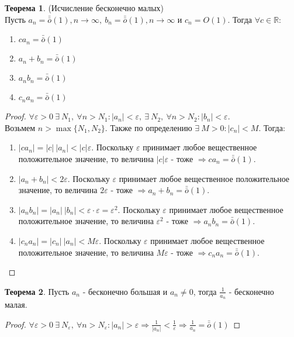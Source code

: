\documentclass[a4paper, 12pt]{article}
\newcommand{\R}{\mathbb{R}}
\renewcommand{\epsilon}{\varepsilon}
\theoremstyle{definition}
\newtheorem*{theorem}{Теорема}
\begin{document}
        \begin{theorem} (Исчисление бесконечно малых)\\
            Пусть $a_n=\bar{\bar{o}}{(1)}, n\to \infty,\ b_n=\bar{\bar{o}}{(1)}, n\to \infty$ и $c_n=O(1)$. Тогда $\forall c\in \R$:
            \begin{enumerate}
                \item $ca_n=\bar{\bar{o}}{(1)}$
                \item $a_n+b_n=\bar{\bar{o}}{(1)}$
                \item $a_n b_n=\bar{\bar{o}}{(1)}$
                \item $c_n a_n=\bar{\bar{o}}{(1)}$
            \end{enumerate}
        \end{theorem} 
        \begin{proof}
            $\forall \epsilon>0\ \exists\ N_1,\ \forall n>N_1: |a_n|<\epsilon,\ \exists\ N_2,\ \forall n>N_2: |b_n|<\epsilon$.\\Возьмем $n>\max\{N_1,N_2\}$. Также по определению $\exists\ M>0: |c_n|<M$. Тогда:
            \begin{enumerate}
                \item $|c a_n|=|c|\ |a_n|<|c|\epsilon$. Поскольку $\epsilon$ принимает любое вещественное положительное значение, то величина $|c|\epsilon$ - тоже $\Rightarrow c a_n=\bar{\bar{o}}{(1)}$.
                \item $|a_n+b_n|<2\epsilon$. Поскольку $\epsilon$ принимает любое вещественное положительное значение, то величина $2\epsilon$ - тоже $\Rightarrow a_n+b_n=\bar{\bar{o}}{(1)}$.
                \item $|a_n b_n| = |a_n|\ |b_n|<\epsilon\cdot\epsilon=\epsilon^2$. Поскольку $\epsilon$ принимает любое вещественное положительное значение, то величина $\epsilon^2$ - тоже $\Rightarrow a_n b_n=\bar{\bar{o}}{(1)}$.
                \item $|c_n a_n|=|c_n|\ |a_n|<M\epsilon$. Поскольку $\epsilon$ принимает любое вещественное положительное значение, то величина $M\epsilon$ - тоже $\Rightarrow c_n a_n =\bar{\bar{o}}{(1)}$.
            \end{enumerate}
        \end{proof} 
        \begin{theorem}
            Пусть $a_n$ - бесконечно большая и $a_n\ne 0$, тогда $\frac{1}{a_n}$ - бесконечно малая.
        \end{theorem} 
        \begin{proof}
            $\forall \epsilon>0\ \exists\ N_{\epsilon},\ \forall n>N_{\epsilon}: |a_n|>\epsilon \Rightarrow \frac{1}{|a_n|}<\frac{1}{\epsilon} \Rightarrow \frac{1}{a_n}=\bar{\bar{o}}{(1)}$
        \end{proof} 
\end{document}
